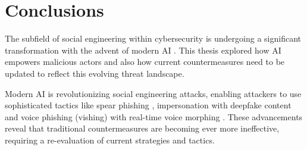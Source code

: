 



\chapter{Conclusions\label{chapter:conclusions}}

\begin{comment}

Guides:
    - 1 to 3 pages max?
    - No subsections

TODO:
    [ ] How AI has augmented SE attacks and countermeasures
    [ ] Gap in the literature

What to cover:
    - How AI has augmented SE attacks and countermeasures
    - Gap in the literature regarding SE and AI intersection?
    - Analysis on where AI-powered SE attacks might be headed in the future
        - Also about robotics and human-like actors
    - What organizations and individuals need to do regarding the evolving landscape of SE attacks

Speculation:
    - Drones dropping USB thumbdrives?
    - Human-like android as threat actors
    - Impact of robotics on dumpster diving, shoulder surfing and baiting
    
Literature:
    - Gen and detection of deepfakes

From training material:
    - "Yhteenveto vaatimattomimmillaan on vain lyhyt kertaus kirjoituksen keskeisistä asioista. Arvokkaamman yhteenvedon saa aikaan kommentoimalla työn tulosten arvoa, työn liittymistä ympäristöön ja tulevaisuudennäkymiä. Tällaiset arviot huolellisesti perusteltava."
    - "Yhteenvetoluku kuvaa teknisten johtopäätösten tuomaa impaktia"

\end{comment}

The subfield of social engineering within cybersecurity is undergoing a significant transformation with the advent of modern AI \citep{fakhouriAIDrivenSolutionsForSocialEngineeringAttacks2024}. This thesis explored how AI empowers malicious actors and also how current countermeasures need to be updated to reflect this evolving threat landscape.

Modern AI is revolutionizing social engineering attacks, enabling attackers to use sophisticated tactics like spear phishing \citep{basitComprehensiveSurveyAIenabledPhishingAttacks2021}, impersonation with deepfake content \citep{mirskyTheCreationAndDetectionOfDeepfakes2021} and voice phishing (vishing) with real-time voice morphing \citep{doanBTSEAudioDeepfakeDetectiong2023}. These advancements reveal that traditional countermeasures are becoming ever more ineffective, requiring a re-evaluation of current strategies and tactics.

